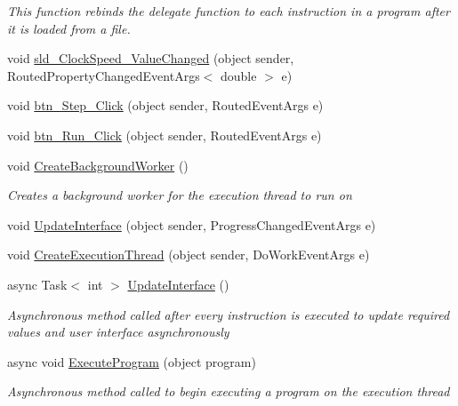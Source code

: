 \begin{DoxyCompactItemize}
\begin{DoxyCompactList}\small\item\em This function rebinds the delegate function to each instruction in a program after it is loaded from a file. \end{DoxyCompactList}\item 
void \hyperlink{class_c_p_u___o_s___simulator_1_1_main_window_ace253c0b4beef8898af97df25666df2f}{sld\+\_\+\+Clock\+Speed\+\_\+\+Value\+Changed} (object sender, Routed\+Property\+Changed\+Event\+Args$<$ double $>$ e)
\item 
void \hyperlink{class_c_p_u___o_s___simulator_1_1_main_window_a897049d123dd2ecf2820b02205ce1969}{btn\+\_\+\+Step\+\_\+\+Click} (object sender, Routed\+Event\+Args e)
\item 
void \hyperlink{class_c_p_u___o_s___simulator_1_1_main_window_a1f4dedca9ad81ea1c92637759515797f}{btn\+\_\+\+Run\+\_\+\+Click} (object sender, Routed\+Event\+Args e)
\item 
void \hyperlink{class_c_p_u___o_s___simulator_1_1_main_window_ad225bd7394d6ad45de9db58b562b91f7}{Create\+Background\+Worker} ()
\begin{DoxyCompactList}\small\item\em Creates a background worker for the execution thread to run on \end{DoxyCompactList}\item 
void \hyperlink{class_c_p_u___o_s___simulator_1_1_main_window_a10f38a4699847dd70069ca66aef16c5b}{Update\+Interface} (object sender, Progress\+Changed\+Event\+Args e)
\item 
void \hyperlink{class_c_p_u___o_s___simulator_1_1_main_window_a83ba6352a96515569978030013c84b72}{Create\+Execution\+Thread} (object sender, Do\+Work\+Event\+Args e)
\item 
async Task$<$ int $>$ \hyperlink{class_c_p_u___o_s___simulator_1_1_main_window_adbb759abbf37061f785e82a9e7f7b3e1}{Update\+Interface} ()
\begin{DoxyCompactList}\small\item\em Asynchronous method called after every instruction is executed to update required values and user interface asynchronously \end{DoxyCompactList}\item 
async void \hyperlink{class_c_p_u___o_s___simulator_1_1_main_window_a03d4ec6b5990ad572db709f5305dd7ca}{Execute\+Program} (object program)
\begin{DoxyCompactList}\small\item\em Asynchronous method called to begin executing a program on the execution thread \end{DoxyCompactList}\item 

\end{DoxyCompactItemize}
